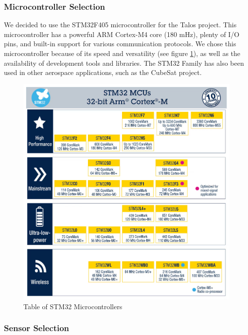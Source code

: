 \documentclass{article}
\begin{document}
\subsubsection{Microcontroller Selection}
We decided to use the STM32F405 microcontroller for the Talos project. This microcontroller has a powerful ARM Cortex-M4 core (180 mHz), plenty of I/O pins, and built-in support for various communication protocols. We chose this microcontroller because of its speed and versatility (see figure \ref{fig:microcontrollers}), as well as the availability of development tools and libraries. The STM32 Family has also been used in other aerospace applications, such as the CubeSat project\cite{Yost_2023}.
\begin{figure}[p]
      \caption{Table of STM32 Microcontrollers\cite{STM32_Table}}
      \label{fig:microcontrollers}
      \includegraphics[width=\textwidth]{stm_mcu_chart.jpg}
      \centering
\end{figure}

\subsubsection{Sensor Selection}
\end{document}
